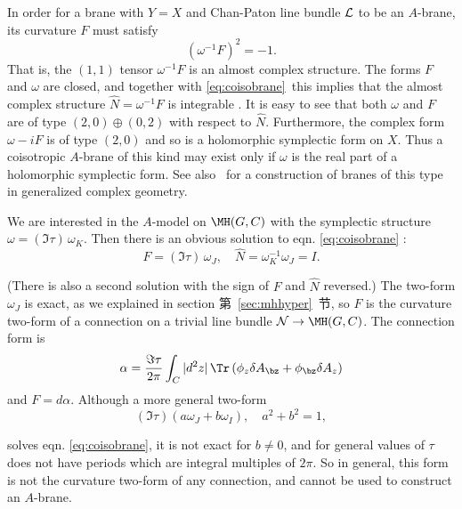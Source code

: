 In order for a brane with $Y=X$ and Chan-Paton line bundle ${\cal
L}$ to be an $A$-brane, its curvature $F$ must satisfy
\setcounter{equation}{0}
\begin{equation}\label{eq:coisobrane}
(\omega^{-1}F)^2=-1.
\end{equation}
 That is, the $(1,1)$ tensor
$\omega^{-1}F$ is an almost complex structure. The forms $F$ and
$\omega$ are closed, and together with \eqref{eq:coisobrane}\ this implies
that the almost complex structure $\hat N=\omega^{-1}F$ is
integrable \cite{ref80}. It is easy to see that both $\omega$ and $F$
are of type $(2,0)\oplus(0,2)$ with respect to $\hat N$.
Furthermore, the complex form $\omega-iF$ is of type $(2,0)$ and
so is a holomorphic symplectic form on $X$. Thus a coisotropic
$A$-brane of this kind may exist only if $\omega$ is the real part
of a holomorphic symplectic form.  See also \cite{ref67}\ for a
construction of branes of this type in generalized complex
geometry.

We are interested in the $A$-model on $\MH(G,C)$ with the
symplectic structure $\omega=(\Im\tau)\, \omega_K$. Then there is
an obvious solution to eqn. \eqref{eq:coisobrane} : %
\setcounter{equation}{1}
\begin{equation}\label{eq:yetro}
F=
(\Im\tau)\,\omega_J,\quad \hat N=\omega_K^{-1}\omega_J= I.
\end{equation}

(There is also a second solution with the sign of $F$ and $\hat N$
reversed.) The two-form $\omega_J$ is exact, as we explained in
section 第~\ref{sec:mhhyper}~节, so $F$ is the curvature two-form of a connection
on a trivial line bundle ${\cal N}\to\MH(G,C)$. The connection
form is %
\setcounter{equation}{2}
\begin{equation}\label{eq:exactcc}
\alpha={\Im\tau\over {2\pi}}\int_C |d^2z|\,
\Tr \left(\phi_z\delta A_\bz +\phi_\bz \delta A_z\right)
\end{equation}
 and
$F=d\alpha$. Although a more general two-form %
\setcounter{equation}{3}
\begin{equation}\label{eq:lombo}
(\Im\tau)\left(a\omega_J+b\omega_I\right), \quad a^2+b^2=1,
\end{equation}

solves eqn. \eqref{eq:coisobrane}, it is not exact for $b\neq 0$, and for
general values of $\tau$ does not have periods which are integral
multiples of $2\pi$. So in general, this form is not the curvature
two-form of any connection, and cannot be used to construct an
$A$-brane.

